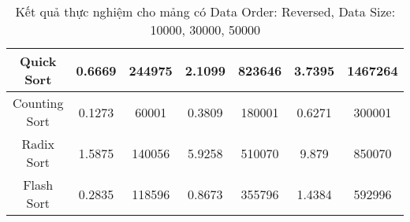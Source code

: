 \begin{table}[H]
{\begin{tabular}{|ccccccc|}
\multicolumn{1}{|c|}{Quick Sort} & \multicolumn{1}{c|}{0.6669} & \multicolumn{1}{c|}{244975} & \multicolumn{1}{c|}{2.1099} & \multicolumn{1}{c|}{823646} & \multicolumn{1}{c|}{3.7395} & \multicolumn{1}{c|}{1467264} \\ \hline
\multicolumn{1}{|c|}{Counting Sort} & \multicolumn{1}{c|}{0.1273} & \multicolumn{1}{c|}{60001} & \multicolumn{1}{c|}{0.3809} & \multicolumn{1}{c|}{180001} & \multicolumn{1}{c|}{0.6271} & \multicolumn{1}{c|}{300001} \\ \hline
\multicolumn{1}{|c|}{Radix Sort} & \multicolumn{1}{c|}{1.5875} & \multicolumn{1}{c|}{140056} & \multicolumn{1}{c|}{5.9258} & \multicolumn{1}{c|}{510070} & \multicolumn{1}{c|}{9.879} & \multicolumn{1}{c|}{850070} \\ \hline
\multicolumn{1}{|c|}{Flash Sort} & \multicolumn{1}{c|}{0.2835} & \multicolumn{1}{c|}{118596} & \multicolumn{1}{c|}{0.8673} & \multicolumn{1}{c|}{355796} & \multicolumn{1}{c|}{1.4384} & \multicolumn{1}{c|}{592996} \\ \hline
\end{tabular}%
}
\caption{Kết quả thực nghiệm cho mảng có Data Order: Reversed, Data Size: 10000, 30000, 50000}
\label{tab:reversed_10000_30000_50000}
\end{table}

